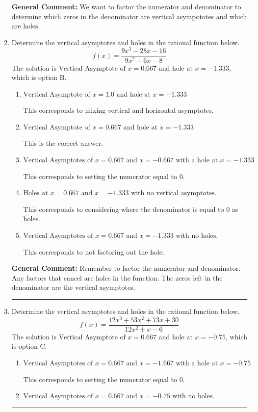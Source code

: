 \documentclass{extbook}[14pt]
\newcommand{\litem}[1]{\item #1

\rule{\textwidth}{0.4pt}}
\begin{document}
\begin{enumerate}
{\textbf{General Comment:} We want to factor the numerator and denominator to determine which zeros in the denominator are vertical asympototes and which are holes.
}
\litem{
Determine the vertical asymptotes and holes in the rational function below.
\[ f(x) = \frac{9x^{3} -28 x -16}{9x^{2} +6 x -8} \]The solution is \( \text{Vertical Asymptote of } x = 0.667 \text{ and hole at } x = -1.333 \), which is option B.\begin{enumerate}[label=\Alph*.]
\item \( \text{Vertical Asymptote of } x = 1.0 \text{ and hole at } x = -1.333 \)

This corresponds to mixing vertical and horizontal asymptotes.
\item \( \text{Vertical Asymptote of } x = 0.667 \text{ and hole at } x = -1.333 \)

This is the correct answer.
\item \( \text{Vertical Asymptotes of } x = 0.667 \text{ and } x = -0.667 \text{ with a hole at } x = -1.333 \)

This corresponds to setting the numerator equal to 0.
\item \( \text{Holes at } x = 0.667 \text{ and } x = -1.333 \text{ with no vertical asymptotes.} \)

This corresponds to considering where the denominator is equal to 0 as holes.
\item \( \text{Vertical Asymptotes of } x = 0.667 \text{ and } x = -1.333 \text{ with no holes.} \)

This corresponds to not factoring out the hole.
\end{enumerate}

\textbf{General Comment:} Remember to factor the numerator and denominator. Any factors that cancel are holes in the function. The zeros left in the denominator are the vertical asymptotes.
}
\litem{
Determine the vertical asymptotes and holes in the rational function below.
\[ f(x) = \frac{12x^{3} +53 x^{2} +73 x + 30}{12x^{2} +x -6} \]The solution is \( \text{Vertical Asymptote of } x = 0.667 \text{ and hole at } x = -0.75 \), which is option C.\begin{enumerate}[label=\Alph*.]
\item \( \text{Vertical Asymptotes of } x = 0.667 \text{ and } x = -1.667 \text{ with a hole at } x = -0.75 \)

This corresponds to setting the numerator equal to 0.
\item \( \text{Vertical Asymptotes of } x = 0.667 \text{ and } x = -0.75 \text{ with no holes.} \)


\end{enumerate}}
\end{enumerate}
\end{document}
